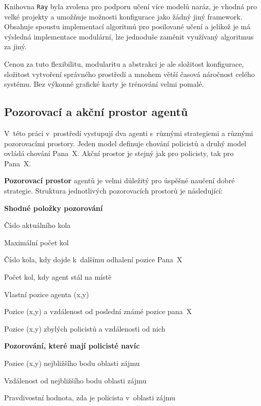 Knihovna \texttt{Ray} byla zvolena pro podporu učení více modelů naráz, je vhodná pro velké projekty a umožňuje možnosti konfigurace jako žádný jiný framework.
Obsahuje spoustu implementací algoritmů pro posilované učení a jelikož je má výsledná implementace modulární, lze jednoduše zaměnit využívaný algoritmus za jiný.

Cenou za tuto flexibilitu, modularitu a abstrakci je ale složitost konfigurace, složitost vytvoření správného prostředí a mnohem větší časová náročnost celého systému.
Bez výkonné grafické karty je trénování velmi pomalé.

\subsection{Pozorovací a akční prostor agentů}
V~této práci v~prostředí vystupují dva agenti s~různými strategiemi a různými pozorovacími prostory.
Jeden model definuje chování policistů a druhý model ovládá chování Pana~X\@.
Akční prostor je stejný jak pro policisty, tak pro Pana~X\@.

\bigskip
\textbf{Pozorovací prostor} agentů je velmi důležitý pro úspěšné naučení dobré strategie.
Struktura jednotlivých pozorovacích prostorů je následující:

\begin{myitemize}
  \item \textbf{Shodné položky pozorování}
  \begin{myitemize}
    \item Číslo aktuálního kola
    \item Maximální počet kol
    \item Číslo kola, kdy dojde k~dalšímu odhalení pozice Pana~X
    \item Počet kol, kdy agent stál na místě
    \item Vlastní pozice agenta (x,y)
    \item Pozice (x,y) a vzdálenost od poslední známé pozice pana~X
    \item Pozice (x,y) zbylých policistů a vzdálenosti od nich
  \end{myitemize}
  \item \textbf{Pozorování, které mají policisté navíc}
    \begin{myitemize}
    \item Pozice (x,y) nejbližšího bodu oblasti zájmu
    \item Vzdálenost od nejbližšího bodu oblasti zájmu
    \item Pravdivostní hodnota, zda je policista v~oblasti zájmu
  \end{myitemize}
\end{myitemize}

